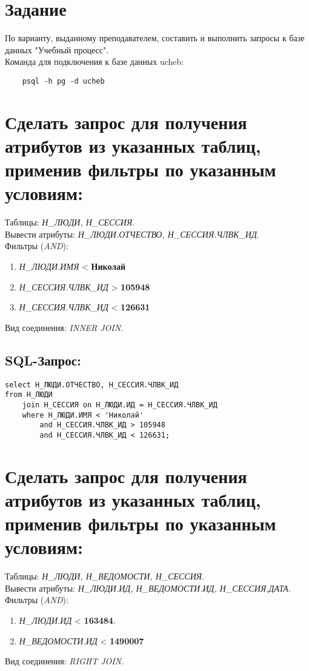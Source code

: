 
\vspace{3cm}
\tableofcontents

\newpage

\section{Задание}

По варианту, выданному преподавателем, составить и выполнить запросы к базе данных "Учебный процесс".\\
Команда для подключения к базе данных ucheb:\\
\begin{verbatim}
	psql -h pg -d ucheb
\end{verbatim}

\newpage
\section{Сделать запрос для получения атрибутов из указанных таблиц, применив фильтры по указанным условиям:}
Таблицы: \textit{Н\_ЛЮДИ, Н\_СЕССИЯ}. \\
Вывести атрибуты: \textit{Н\_ЛЮДИ.ОТЧЕСТВО, Н\_СЕССИЯ.ЧЛВК\_ИД}. \\
Фильтры (\textit{AND}): \\
\begin{enumerate}
	\item \textit{Н\_ЛЮДИ.ИМЯ} < \textbf{Николай}
	\item \textit{Н\_СЕССИЯ.ЧЛВК\_ИД} > \textbf{105948}
	\item \textit{Н\_СЕССИЯ.ЧЛВК\_ИД} < \textbf{126631}
\end{enumerate}
Вид соединения: \textit{INNER JOIN}.

\subsection{SQL-Запрос:}
\begin{verbatim}
select Н_ЛЮДИ.ОТЧЕСТВО, Н_СЕССИЯ.ЧЛВК_ИД
from Н_ЛЮДИ
	join Н_СЕССИЯ on Н_ЛЮДИ.ИД = Н_СЕССИЯ.ЧЛВК_ИД
	where Н_ЛЮДИ.ИМЯ < 'Николай'
		and Н_СЕССИЯ.ЧЛВК_ИД > 105948
		and Н_СЕССИЯ.ЧЛВК_ИД < 126631;
\end{verbatim}

\newpage
\section{Сделать запрос для получения атрибутов из указанных таблиц, применив фильтры по указанным условиям:}
Таблицы: \textit{Н\_ЛЮДИ, Н\_ВЕДОМОСТИ, Н\_СЕССИЯ}. \\
Вывести атрибуты: \textit{Н\_ЛЮДИ.ИД, Н\_ВЕДОМОСТИ.ИД, Н\_СЕССИЯ.ДАТА}. \\
Фильтры (\textit{AND}): \\
\begin{enumerate}
	\item \textit{Н\_ЛЮДИ.ИД} < \textbf{163484}.
	\item \textit{Н_ВЕДОМОСТИ.ИД} < \textbf{1490007}
\end{enumerate}
Вид соединения: \textit{RIGHT JOIN}.

